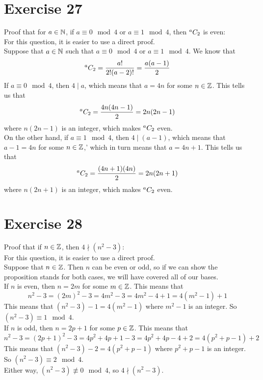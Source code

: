 \documentclass[12pt]{article}
\begin{document}
    \section*{Exercise 27}
    Proof that for $a \in \mathbb{N}$,
    if $a \equiv 0 \mod 4$ or $a \equiv 1 \mod 4$,
    then ${}^{a}C_{2}$ is even: \\
    For this question, it is easier to use a direct proof. \\
    Suppose that $a \in \mathbb{N}$
    such that $a \equiv 0 \mod 4$ or $a \equiv 1 \mod 4$.
    We know that
    \[ {}^{a}C_{2} = \dfrac{a!}{2!(a-2)!} = \dfrac{a(a-1)}{2} \]
    If $a \equiv 0 \mod 4$,
    then $4 \mid a$,
    which means that $a = 4n$ for some $n \in \mathbb{Z}$.
    This tells us that 
    \[ {}^{a}C_{2} = \dfrac{4n(4n-1)}{2} = 2n(2n-1) \]
    where $n(2n-1)$ is an integer,
    which makes ${}^{a}C_{2}$ even. \\
    On the other hand, if $a \equiv 1 \mod 4$,
    then $4 \mid (a-1)$,
    which means that $a-1 = 4n$ for some $n \in \mathbb{Z}$,'
    which in turn means that $a = 4n + 1$.
    This tells us that 
    \[ {}^{a}C_{2} = \dfrac{(4n+1)(4n)}{2} = 2n(2n+1) \]
    where $n(2n+1)$ is an integer,
    which makes ${}^{a}C_{2}$ even. \\

    \section*{Exercise 28}
    Proof that if $n \in \mathbb{Z}$,
    then $4 \nmid (n^2 - 3)$: \\
    For this question, it is easier to use a direct proof. \\
    Suppose that $n \in \mathbb{Z}$.
    Then $n$ can be even or odd,
    so if we can show the proposition stands for both cases,
    we will have covered all of our bases. \\
    If $n$ is even,
    then $n = 2m$ for some $m \in \mathbb{Z}$.
    This means that
    \[ n^2 - 3 = (2m)^2 - 3 = 4m^2 - 3 = 4m^2 - 4 + 1 = 4(m^2 - 1) + 1 \]
    This means that $(n^2 - 3) - 1 = 4(m^2 - 1)$
    where $m^2 - 1$ is an integer.
    So $(n^2 - 3) \equiv 1 \mod 4$. \\
    If $n$ is odd,
    then $n = 2p+1$ for some $p \in \mathbb{Z}$.
    This means that
    \[ n^2 - 3 = (2p+1)^2 - 3 = 4p^2 + 4p + 1 - 3 =
    4p^2 + 4p - 4 + 2 = 4(p^2 + p - 1) + 2 \]
    This means that $(n^2 - 3) - 2 = 4(p^2 + p - 1)$
    where $p^2 + p - 1$ is an integer.
    So $(n^2 - 3) \equiv 2 \mod 4$. \\
    Either way,
    $(n^2 - 3) \not\equiv 0 \mod 4$,
    so $4 \nmid (n^2 - 3)$. \\
\end{document}
